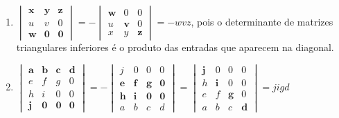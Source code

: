 \documentclass[12pt,a4paper]{article}
\begin{document}
\begin{enumerate}
\begin{enumerate}
\item 
$\begin{vmatrix}
\textbf{x} & \textbf{y} & \textbf{z} \\
u & v & 0 \\
\textbf{w} & \textbf{0} & \textbf{0}
\end{vmatrix}
= -
\begin{vmatrix}
\textbf{w} & 0 & 0 \\
u & \textbf{v} & 0 \\
x & y & \textbf{z}
\end{vmatrix}
= -wvz$, pois o determinante de matrizes triangulares inferiores é o produto das entradas que aparecem na diagonal.

\item 
$\begin{vmatrix}
\textbf{a} & \textbf{b} & \textbf{c} & \textbf{d} \\
e & f & g & 0\\
h & i & 0 & 0\\
\textbf{j} & \textbf{0} & \textbf{0} & \textbf{0}
\end{vmatrix}
= -
\begin{vmatrix}
j & 0 & 0 & 0\\
\textbf{e} & \textbf{f} & \textbf{g} & \textbf{0}\\
\textbf{h} & \textbf{i} & \textbf{0} & \textbf{0}\\
a & b & c & d
\end{vmatrix}
=
\begin{vmatrix}
\textbf{j} & 0 & 0 & 0\\
h & \textbf{i} & 0 & 0\\
e & f & \textbf{g} & 0\\
a & b & c & \textbf{d}
\end{vmatrix}
= jigd$


\end{enumerate}
\end{enumerate}
\end{document}
